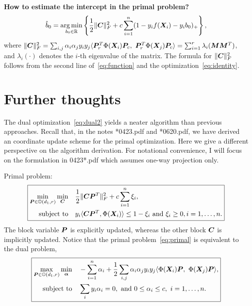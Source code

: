 \documentclass[11pt]{article}
\theoremstyle{plain}
\theoremstyle{definition}
\begin{document}
{\bf How to estimate the intercept in the primal problem?}\\
\[
\hat b_0=\operatorname*{arg\,min}_{b_0\in\mathbb{R}}\left\{ {1\over 2}\lVert\bm C\rVert_F^2+c\sum_{i=1}^n(1-y_if(\bm X_i)-y_ib_0)_{+}\right\},
\]
where $\lVert\bm C\rVert_F^2=\sum_{i,j}\alpha_i\alpha_jy_iy_j\langle \bm{P}^T_r\Phi(\bm X_i)\bm{P}_c,\ \bm{P}^T_r\Phi(\bm X_j)\bm{P}_c\rangle = \sum_{i=1}^r\lambda_i(\bm M\bm M^T)$,  and $\lambda_i(\cdot)$ denotes the $i$-th eigenvalue of the matrix. The formula for $\lVert\bm C\rVert_F^2$ follows from the second line of~\eqref{eq:function} and the optimization~\eqref{eq:identity}.

\section{Further thoughts}
The dual optimization~\eqref{eq:dual2} yields a neater algorithm than previous approaches. Recall that, in the notes *0423.pdf and *0620.pdf, we have derived an coordinate update scheme for the primal optimization. Here we give a different perspective on the algorithm derivation. For notational convenience, I will focus on the formulation in 0423*.pdf which assumes one-way projection only. 

Primal problem:
\begin{equation}
\boxed{
\begin{aligned}\label{eq:primal}
\min_{\bm{P}\in \mathbb{O}(d_1,r)}\min_{\bm C} &\quad {1\over 2}\lVert\bm C\bm{P}^T\rVert_F^2+c\sum_{i=1}^n\xi_i,\\
\text{subject to} &\quad y_i\langle \bm C\bm{P}^T, \Phi(\bm X_i) \rangle \leq 1-\xi_i \ \text{and}\ \xi_i\geq 0, i=1,\ldots,n.
\end{aligned}
}
\end{equation}
The block variable $\bm{P}$ is explicitly updated, whereas the other block $\bm C$ is implicitly updated. Notice that the primal problem~\eqref{eq:primal} is equivalent to the dual problem,
\begin{equation}
\boxed{
\begin{aligned}\label{eq:dual3}
\max_{\bm{P}\in \mathbb{O}(d_1,r)} \min_{\boldsymbol{\alpha}} &\quad  -\sum_{i=1}^n \alpha_i +{1\over 2} \sum_{i,j}\alpha_i\alpha_jy_iy_j\langle \Phi(\bm X_i)\bm{P},\ \Phi(\bm X_j)\bm{P}
\rangle,\\
\text{subject to} &\quad \sum_i y_i\alpha_i=0, \text{ and }0\leq \alpha_i\leq c,\ i=1,\ldots,n.
\end{aligned}
}
\end{equation}
\end{document}
